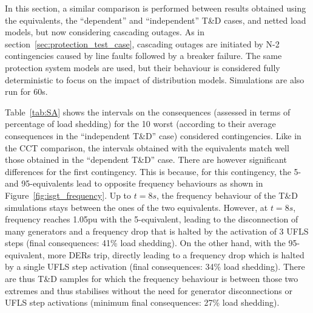 In this section, a similar comparison is performed between results obtained using the equivalents, the ``dependent'' and ``independent'' T\&D cases, and netted load models, but now considering cascading outages. As in section~\ref{sec:protection_test_case}, cascading outages are initiated by N-2 contingencies caused by line faults followed by a breaker failure. The same protection system models are used, but their behaviour is considered fully deterministic to focus on the impact of distribution models. Simulations are also run for 60s.

Table~\ref{tab:SA} shows the intervals on the consequences (assessed in terms of percentage of load shedding) for the 10 worst (according to their average consequences in the ``independent T\&D'' case) considered contingencies. Like in the CCT comparison, the intervals obtained with the equivalents match well those obtained in the ``dependent T\&D'' case. There are however significant differences for the first contingency. This is because, for this contingency, the 5- and 95-equivalents lead to opposite frequency behaviours as shown in Figure~\ref{fig:isgt_frequency}. Up to \(t=8s\), the frequency behaviour of the T\&D simulations stays between the ones of the two equivalents. However, at \(t=8s\), frequency reaches 1.05pu with the 5-equivalent, leading to the disconnection of many generators and a frequency drop that is halted by the activation of 3 UFLS steps (final consequences: 41\% load shedding). On the other hand, with the 95-equivalent, more DERs trip, directly leading to a frequency drop which is halted by a single UFLS step activation (final consequences: 34\% load shedding). There are thus  T\&D samples for which the frequency behaviour is between those two extremes and thus stabilises without the need for generator disconnections or UFLS step activations (minimum final consequences: 27\% load shedding).


